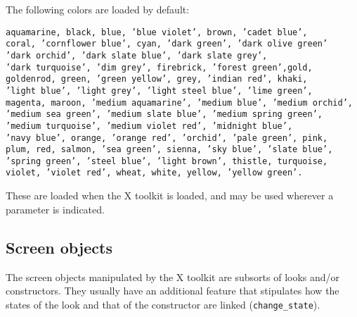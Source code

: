     The following colors are loaded by default:
  \begin{tabbing}
  {\tt aquamarine, black, blue, 'blue violet', brown, 'cadet blue',}\\
  {\tt coral, 'cornflower blue', cyan, 'dark green', 'dark olive green'}\\
  {\tt 'dark orchid', 'dark slate blue',  'dark slate grey',}\\
  {\tt 'dark turquoise', 'dim grey', firebrick, 'forest green',gold,}\\
  {\tt goldenrod, green, 'green yellow', grey, 'indian red', khaki,}\\
  {\tt 'light blue', 'light grey', 'light steel blue', 'lime green',}\\
  {\tt magenta, maroon, 'medium aquamarine', 'medium blue', 'medium orchid',}\\
  {\tt 'medium sea green', 'medium slate blue', 'medium spring green',}\\
  {\tt 'medium turquoise', 'medium violet red', 'midnight blue',}\\
  {\tt 'navy blue', orange, 'orange red', 'orchid', 'pale green', pink,}\\
  {\tt plum, red, salmon, 'sea green', sienna, 'sky blue', 'slate blue',}\\
  {\tt 'spring green', 'steel blue', 'light brown', thistle, turquoise,}\\
  {\tt violet, 'violet red', wheat, white, yellow, 'yellow green'.}
  \end{tabbing}
  These are loaded when the X toolkit is loaded, and may be used
  wherever a  parameter is indicated.

\subsection{Screen objects}

  The screen objects manipulated by the X toolkit are subsorts of looks and/or
  constructors. They usually have an additional feature that
  stipulates how the states of the look and that of the constructor
  are linked (\verb+change_state+). 

